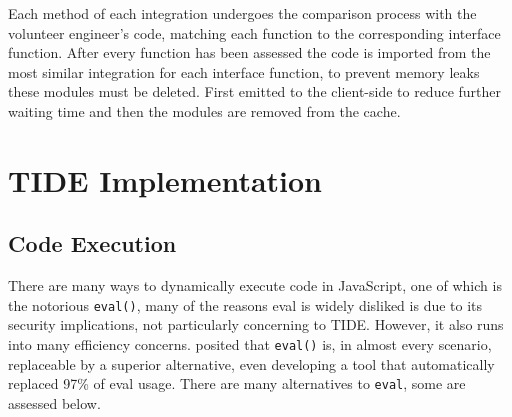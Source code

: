 \documentclass[jou,apacite]{apa6}
\begin{document}
Each method of each integration undergoes the comparison process with the volunteer engineer's code, matching each function to the corresponding interface function. After every function has been assessed the code is imported from the most similar integration for each interface function, to prevent memory leaks these modules must be deleted. First emitted to the client-side to reduce further waiting time and then the modules are removed from the cache.

\section{TIDE Implementation}
\subsection{Code Execution}
There are many ways to dynamically execute code in JavaScript, one of which is the notorious \texttt{eval()}, many of the reasons eval is widely disliked is due to its security implications, not particularly concerning to TIDE. However,  it also runs into many efficiency concerns. \cite{Meawad2012} posited that \texttt{eval()} is, in almost every scenario, replaceable by a superior alternative, even developing a tool that automatically replaced 97\% of eval usage. There are many alternatives to \texttt{eval}, some are assessed below.
\end{document}
